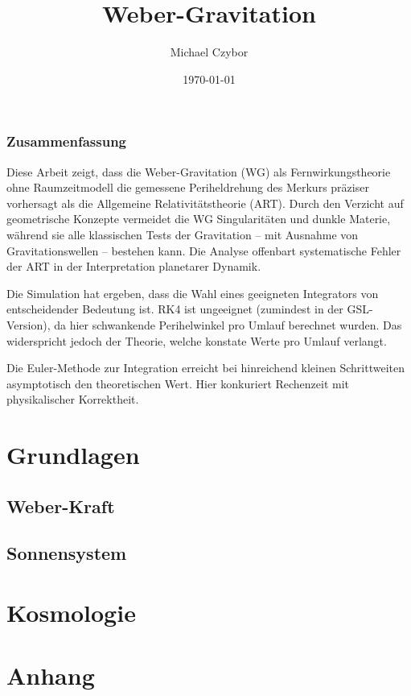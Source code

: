 \documentclass{book}
\numberwithin{equation}{section}
\begin{document}
\title{Weber-Gravitation}
\author{Michael Czybor}
\date{\today}
\maketitle

\section*{Zusammenfassung}
Diese Arbeit zeigt, dass die Weber-Gravitation (WG) als Fernwirkungstheorie ohne Raumzeitmodell die gemessene Periheldrehung des Merkurs präziser
vorhersagt als die Allgemeine Relativitätstheorie (ART). Durch den Verzicht auf geometrische Konzepte vermeidet die WG Singularitäten und dunkle Materie,
während sie alle klassischen Tests der Gravitation – mit Ausnahme von Gravitationswellen – bestehen kann. Die Analyse offenbart systematische Fehler der ART
in der Interpretation planetarer Dynamik.

Die Simulation hat ergeben, dass die Wahl eines geeigneten Integrators von entscheidender Bedeutung ist. RK4 ist ungeeignet (zumindest in der GSL-Version),
da hier schwankende Perihelwinkel pro Umlauf berechnet wurden. Das widerspricht jedoch der Theorie, welche konstate Werte pro Umlauf verlangt.

Die Euler-Methode zur Integration erreicht bei hinreichend kleinen Schrittweiten asymptotisch den theoretischen Wert. Hier konkuriert Rechenzeit
mit physikalischer Korrektheit.

\tableofcontents

\part{Grundlagen}
\chapter{Weber-Kraft}





\chapter{Sonnensystem}


\part{Kosmologie}

\part{Anhang}


\end{document}
